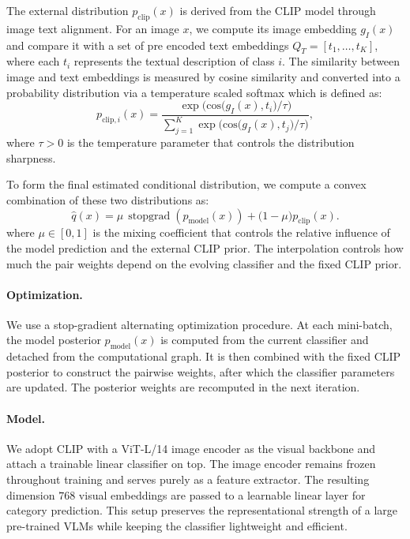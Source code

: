 \documentclass[10pt,twocolumn,letterpaper]{article}
\begin{document}
The external distribution $p_{\mathrm{clip}}(x)$ is derived from the CLIP model through image text alignment. For an image $x$, we compute its image embedding $g_{I}(x)$ and compare it with a set of pre encoded text embeddings $Q_{T}=[t_{1},\ldots,t_{K}]$, where each $t_{i}$ represents the textual description of class $i$. The similarity between image and text embeddings is measured by cosine similarity and converted into a probability distribution via a temperature scaled softmax which is defined as:
\begin{equation}
    p_{\mathrm{clip},i}(x)=\frac{\exp\big(\mathrm{cos}\big(g_{I}(x),t_{i}\big)/\tau\big)}{\sum_{j=1}^{K}\exp\big(\mathrm{cos}\big(g_{I}(x),t_{j}\big)/\tau\big)},
\end{equation}
where $\tau>0$ is the temperature parameter that controls the distribution sharpness.

To form the final estimated conditional distribution, we compute a convex combination of these two distributions as:
\begin{equation}
    \widehat q(x)=\mu\,\operatorname{stopgrad}(p_{\mathrm{model}}(x))+\big(1-\mu\big)p_{\mathrm{clip}}(x).
\end{equation}
where $\mu\in[0,1]$ is the mixing coefficient that controls the relative influence of the model prediction and the external CLIP prior. The interpolation controls how much the pair weights depend on the evolving classifier and the fixed CLIP prior.
  
\paragraph{Optimization.}
We use a stop-gradient alternating optimization procedure. At each mini-batch, the model posterior \(p_{\text{model}}(x)\) is computed from the current classifier and detached from the computational graph. It is then combined with the fixed CLIP posterior to construct the pairwise weights, after which the classifier parameters are updated. The posterior weights are recomputed in the next iteration.

\paragraph{Model.}
We adopt CLIP with a ViT-L/14 image encoder \cite{radford2021clip} as the visual backbone and attach a trainable linear classifier on top. The image encoder remains frozen throughout training and serves purely as a feature extractor. The resulting dimension $768$ visual embeddings are passed to a learnable linear layer for category prediction. This setup preserves the representational strength of a large pre-trained VLMs while keeping the classifier  lightweight and efficient.
\end{document}
